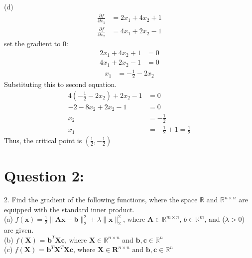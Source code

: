 \documentclass[a4paper,12pt]{article}
\newcommand{\R}{\mathbb{R}}
\begin{document}
(d)
\begin{align*}
    \frac{\partial f}{\partial x_1} &= 2x_1 + 4x_2 + 1 \\
    \frac{\partial f}{\partial x_2} &= 4x_1 + 2x_2 - 1
\end{align*}
set the gradient to 0:
\begin{align*}
    2x_1 + 4x_2 + 1 &= 0 \\
    4x_1 + 2x_2 - 1 &= 0
\end{align*}
\begin{align*}
    x_1 &= - \frac{1}{2} - 2x_2 
\end{align*}
Substituting this to second equation.
\begin{align*}
    4(- \frac{1}{2} - 2x_2) + 2x_2 - 1 &= 0 \\
    -2 - 8x_2 + 2x_2 - 1 &= 0 \\
    x_2 &= -\frac{1}{2} \\
    x_1 &= -\frac{1}{2} + 1 = \frac{1}{2}
\end{align*}
Thus, the critical point is \(\left( \frac{1}{2}, -\frac{1}{2} \right)\)





\section*{Question 2:}
2. Find the gradient of the following functions, where the space \(\R\) and \(\R^{n \times n}\) are equipped with the standard inner product. \\
(a) \(f(\bm{x}) = \frac{1}{2} \|\bm{A}\bm{x} - \bm{b}\|_2^2 + \lambda\|\bm{x}\|_2^2\), where \(\bm{A} \in \R^{m \times n}\), \(b \in \R^m\), and (\(\lambda > 0\)) are given. \\
(b) \(f(\bm{X})\) = \(\bm{b}^T\bm{X}\bm{c}\), where \(\bm{X} \in \R^{n \times n}\) and \(\bm{b}, \bm{c} \in \R^n\) \\
(c) \(f(\bm{X})\) = \(\bm{b}^T\bm{X}^T\bm{X}\bm{c}\), where \(\bm{X} \in \bm{R}^{n \times n}\) and \(\bm{b}, \bm{c} \in \R^n\) 
\end{document}
